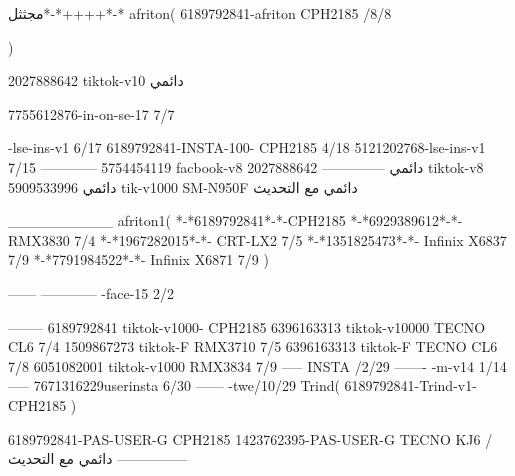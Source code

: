 مجثثل*-*++++*-*
afriton(
6189792841-afriton CPH2185  /8/8

)

2027888642 tiktok-v10
دائمي

7755612876-in-on-se-17 7/7

-lse-ins-v1 6/17
6189792841-INSTA-100- CPH2185 4/18
5121202768-lse-ins-v1 7/15
------------
5754454119 facbook-v8
دائمي
--------------
2027888642 tiktok-v8
دائمي
5909533996 tik-v1000  SM-N950F
دائمي مع التحديث

__________
afriton1(
*-*6189792841*-*-CPH2185
*-*6929389612*-*-  RMX3830  7/4
*-*1967282015*-*-  CRT-LX2  7/5
*-*1351825473*-*-  Infinix X6837  7/9
*-*7791984522*-*-  Infinix X6871  7/9
)


------
------------
-face-15 2/2

--------
6189792841 tiktok-v1000- CPH2185 
6396163313 tiktok-v10000 TECNO CL6  7/4
1509867273 tiktok-F RMX3710  7/5
6396163313 tiktok-F TECNO CL6  7/8
6051082001 tiktok-v1000 RMX3834  7/9
-----
 INSTA /2/29
-------
-m-v14 1/14
-----
7671316229userinsta 6/30
------
-twe/10/29
Trind(
6189792841-Trind-v1- CPH2185 
)


6189792841-PAS-USER-G CPH2185 
1423762395-PAS-USER-G TECNO KJ6  /دائمي مع التحديث
    ---------------
